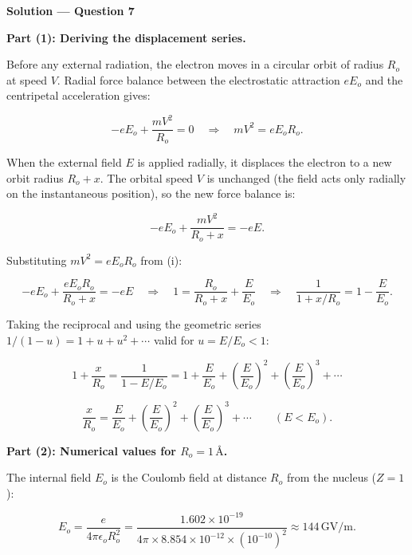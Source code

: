 \textbf{\large Solution --- Question 7}

\textbf{Part (1): Deriving the displacement series.}

Before any external radiation, the electron moves in a circular orbit of radius $R_o$ at speed $V$. Radial force balance between the electrostatic attraction $eE_o$ and the centripetal acceleration gives:

\begin{equation*}
  -eE_o + \frac{mV^2}{R_o} = 0 \quad\Longrightarrow\quad mV^2 = eE_oR_o. \tag{i}
\end{equation*}

When the external field $E$ is applied radially, it displaces the electron to a new orbit radius $R_o + x$. The orbital speed $V$ is unchanged (the field acts only radially on the instantaneous position), so the new force balance is:

\begin{equation*}
  -eE_o + \frac{mV^2}{R_o + x} = -eE.
\end{equation*}

Substituting $mV^2 = eE_oR_o$ from (i):

\begin{equation*}
  -eE_o + \frac{eE_oR_o}{R_o + x} = -eE
  \quad\Longrightarrow\quad
  1 = \frac{R_o}{R_o + x} + \frac{E}{E_o}
  \quad\Longrightarrow\quad
  \frac{1}{1 + x/R_o} = 1 - \frac{E}{E_o}.
\end{equation*}

Taking the reciprocal and using the geometric series $1/(1-u) = 1 + u + u^2 + \cdots$ valid for $u = E/E_o < 1$:

\begin{equation*}
  1 + \frac{x}{R_o} = \frac{1}{1 - E/E_o} = 1 + \frac{E}{E_o} + \left(\frac{E}{E_o}\right)^{\!2} + \left(\frac{E}{E_o}\right)^{\!3} + \cdots
\end{equation*}

\begin{equation*}
  \boxed{\frac{x}{R_o} = \frac{E}{E_o} + \left(\frac{E}{E_o}\right)^{\!2} + \left(\frac{E}{E_o}\right)^{\!3} + \cdots \qquad (E < E_o).}
\end{equation*}

\textbf{Part (2): Numerical values for $R_o = 1\,\text{\AA}$.}

The internal field $E_o$ is the Coulomb field at distance $R_o$ from the nucleus ($Z=1$):

\begin{equation*}
  E_o = \frac{e}{4\pi\epsilon_o R_o^2}
  = \frac{1.602\times10^{-19}}{4\pi\times8.854\times10^{-12}\times(10^{-10})^2}
  \approx 144\,\text{GV/m}.
\end{equation*}


